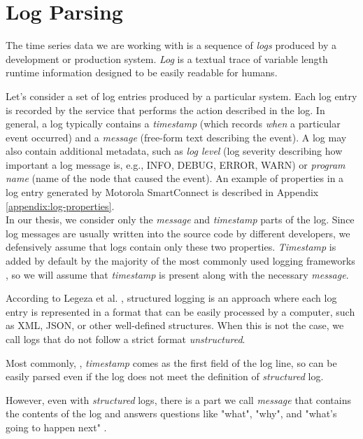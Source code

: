 \section{ Log Parsing }

The time series data we are working with is a sequence of \textit{logs} produced by a development or production system. 
\textit{Log} is a textual trace of variable length runtime information designed to be easily readable for humans.

Let's consider a set of log entries produced by a particular system. Each log entry is recorded by the service that performs the action described in the log. In general, a log typically contains a \textit{timestamp} (which records \textit{when} a particular event occurred) and a \textit{message} (free-form text describing the event). A log may also contain additional metadata, such as \textit{log level} (log severity describing how important a log message is, e.g., INFO, DEBUG, ERROR, WARN) or \textit{program name} (name of the node that caused the event). An example of properties in a log entry generated by Motorola SmartConnect is described in Appendix \ref{appendix:log-properties}.\\

In our thesis, we consider only the \textit{message} and \textit{timestamp} parts of the log. Since log messages are usually written into the source code by different developers, we defensively assume that logs contain only these two properties. \textit{Timestamp} is added by default by the majority of the most commonly used logging frameworks \cite{log4j:example} \cite{serilog:example} \cite{python_log:example}, so we will assume that \textit{timestamp} is present along with the necessary \textit{message}.

According to Legeza et al. \cite{structured_logging}, structured logging is an approach where each log entry is represented in a format that can be easily processed by a computer, such as XML, JSON, or other well-defined structures. When this is not the case, we call logs that do not follow a strict format \textit{unstructured}.

Most commonly, \cite{log4j:example} \cite{serilog:example} \cite{python_log:example}, \textit{timestamp} comes as the first field of the log line, so can be easily parsed even if the log does not meet the definition of \textit{structured} log.

However, even with \textit{structured} logs, there is a part we call \textit{message} that contains the contents of the log and answers questions like "what", "why", and "what's going to happen next" \cite{structured_logging}.\\


